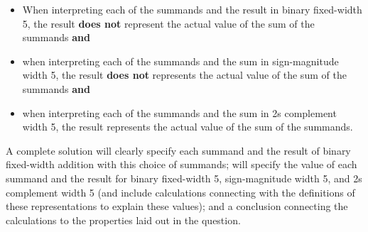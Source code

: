 \begin{enumerate}[labelindent=0pt, leftmargin=0pt]
\begin{enumerate}
            \begin{itemize}
            \item[(1)] When interpreting each of the summands and the result in binary fixed-width 5, 
            the result {\bf does not} represent the actual value of the sum of the summands {\bf and}
            \item[(2)] when interpreting each of the summands and the sum in sign-magnitude width 5, the result  
            {\bf does not} represents the actual value of the sum of the summands {\bf and}
            \item[(3)] when interpreting each of the summands and the sum in 2s complement width 5, the result 
            represents the actual value of the sum of the summands.
            \end{itemize}
            A complete solution will clearly specify each summand and the result of binary fixed-width addition 
            with this choice of summands; will specify  the value of each summand and the result for 
            binary fixed-width 5, 
            sign-magnitude width 5, and 2s complement width 5 (and include calculations connecting with the 
            definitions of these representations to explain these values); and a conclusion connecting
            the calculations to the properties laid out in the question.
        \end{enumerate}  
\end{enumerate}
